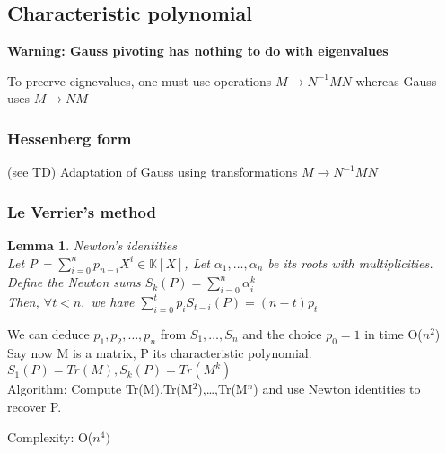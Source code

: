 \documentclass{article}
\newtheorem{lemma}{Lemma}
\theoremstyle{definition}
\theoremstyle{remark}
\newcommand{\K}{\mathbb{K}}
\begin{document}
	\subsection{Characteristic polynomial}
	
	\textbf{\underline{Warning:} Gauss pivoting has \underline{nothing} to do with eigenvalues}
	
	To preerve eignevalues, one must use operations $M \rightarrow N^{-1}MN$ whereas Gauss uses $M \rightarrow NM$
	\subsubsection{Hessenberg form}
	(see TD)
	Adaptation of Gauss using transformations $M \rightarrow N^{-1}MN$
	\subsubsection{Le Verrier's method}
	\begin{lemma}
		Newton's identities\\
		Let P = $\sum_{i = 0}^{n}p_{n-i} X^i \in \K[X]$, Let $\alpha_1,\dots,\alpha_n$ be its roots with multiplicities.\\
		Define the Newton sums $S_k(P) = \sum_{i = 0}^{n} \alpha_i^k$\\
		Then, $\forall t < n,$ we have $\sum_{i = 0}^{t} p_iS_{t-i}(P) = (n-t)p_t$
	\end{lemma}
	We can deduce $p_1,p_2,\dots,p_n$ from $S_1,\dots,S_n$ and the choice $p_0 = 1$ in time O($n^2$)\\
	
	Say now M is a matrix, P its characteristic polynomial. $S_1(P) = Tr(M), S_k(P) = Tr(M^k)$\\
	
	Algorithm:
	Compute Tr(M),Tr(M$^2$),\dots,Tr(M$^n$) and use Newton identities to recover P.
	
	Complexity: O($n^4)$
\end{document}
